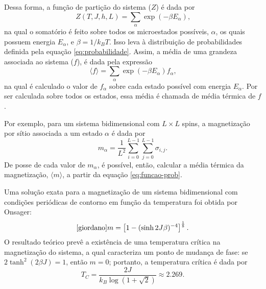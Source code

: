 Dessa forma, a função de partição do sistema ($Z$) é dada por
\begin{equation}\label{eq:particao}
Z\left(T, J, h, L\right) = \sum _{\alpha} \exp\left(-\beta E_{\alpha}\right)\text{,}
\end{equation}
na qual o somatório é feito sobre todos os microestados possíveis, $\alpha$, os quais possuem energia $E_{\alpha}$, e $\beta = 1/k_B T$. Isso leva à distribuição de probabilidades definida pela equação \ref{eq:probabilidade}. Assim, a média de uma grandeza associada ao sistema ($f$), é dada pela expressão
\begin{equation}\label{eq:funcao-prob}
\langle f \rangle = \sum _{\alpha} \exp\left(-\beta E_{\alpha}\right) f_{\alpha}\text{,}
\end{equation}
na qual é calculado o valor de $f_{\alpha}$ sobre cada estado possível com energia $E_{\alpha}$. Por ser calculada sobre todos os estados, essa média é chamada de média térmica de $f$.

Por exemplo, para um sistema bidimensional com $L \times L$ spins, a magnetização por sítio associada a um estado $\alpha$ é dada por
\begin{equation}\label{eq:magnetizacao2d}
m_{\alpha} = \frac{1}{L^2} \sum ^{L - 1}_{i = 0} \sum ^{L - 1} _{j = 0} \sigma _{i, j}\text{.}
\end{equation}
De posse de cada valor de $m_{\alpha}$, é possível, então, calcular a média térmica da magnetização, $\langle m \rangle$, a partir da equação \ref{eq:funcao-prob}.

Uma solução exata para a magnetização de um sistema bidimensional com condições periódicas de contorno em função da temperatura foi obtida por Onsager:
\begin{equation}\label{eq:onsager}\cite{giordano}
m = \left[1 - (\sinh 2 J \beta)^{-4}\right]^{\frac{1}{8}}\text{.}
\end{equation}
O resultado teórico prevê a existência de uma temperatura crítica na magnetização do sistema, a qual caracteriza um ponto de mudança de fase: se $2 \tanh ^2 (2 \beta J) = 1$, então $m = 0$; portanto, a temperatura crítica é dada por
\begin{equation}\label{eq:temp-crit}
T_C = \frac{2 J}{k_B \log(1 + \sqrt{2})} \approx 2.269\text{.}
\end{equation}
